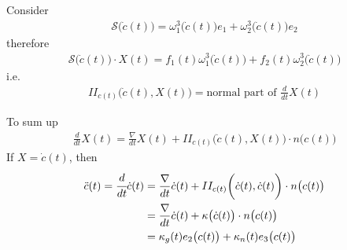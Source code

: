 \documentclass[10pt]{article}
\begin{document}
            \begin{definition}
                Consider
                \begin{equation*}
                    \begin{aligned}
                        \mathcal{S}\big(\dot{c}(t)\big) = \omega_1^3\big(\dot{c}(t)\big)e_1 + \omega_2^3\big(\dot{c}(t)\big)e_2
                    \end{aligned}
                \end{equation*}
                therefore
                \begin{equation*}
                    \begin{aligned}
                        \mathcal{S}\big(\dot{c}(t)\big)\cdot X(t) = f_1(t)\omega_1^3\big(\dot{c}(t)\big) + f_2(t)\omega_2^3\big(\dot{c}(t)\big)
                    \end{aligned}
                \end{equation*}
                i.e.
                \begin{equation*}
                    \begin{aligned}
                        II_{c(t)}\bigg(\dot{c}(t), X(t)\bigg) = \text{normal part of } \frac{d}{dt}X(t)
                    \end{aligned}
                \end{equation*}
            \end{definition}

            \begin{theorem}
                To sum up
                \begin{equation*}
                    \begin{aligned}
                        \frac{d}{dt}X(t) = \frac{\nabla}{dt}X(t) + II_{c(t)}\bigg(\dot{c}(t), X(t)\bigg)\cdot n\big(c(t)\big)
                    \end{aligned}
                \end{equation*}
                If $X = \dot{c}(t)$, then
                \begin{equation*}
                    \begin{aligned}
                        \ddot{c}(t) = \cfrac{d}{dt}\dot{c}(t) &= \frac{\nabla}{dt}\dot{c}(t) + II_{c(t)}\bigg(\dot{c}(t), \dot{c}(t)\bigg)\cdot n\big(c(t)\big) \\
                        &= \frac{\nabla}{dt}\dot{c}(t) + \kappa\big(\dot{c}(t)\big)\cdot n\big(c(t)\big) \\
                        &= \kappa_g(t)e_2\big(c(t)\big) + \kappa_n(t)e_3\big(c(t)\big)
                    \end{aligned}
                \end{equation*}
            \end{theorem}
\end{document}
